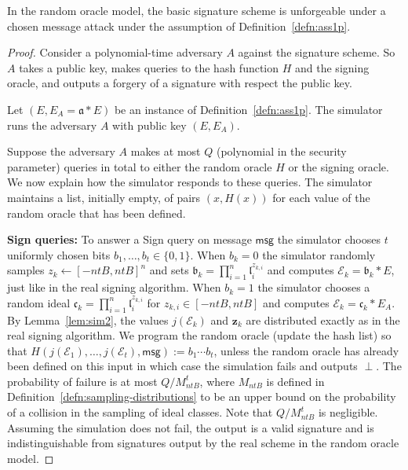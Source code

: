 \documentclass{llncs}
\newcommand{\E}{\mathcal{E}}
\newcommand{\msg}{\mathsf{msg}}
\renewcommand{\a}{\mathfrak{a}}
\renewcommand{\b}{\mathfrak{b}}
\renewcommand{\c}{\mathfrak{c}}
\renewcommand{\l}{\mathfrak{l}}
\newcommand{\z}{\mathbf{z}}
\begin{document}
\begin{theorem}\label{thm:security-basic}
In the random oracle model, the basic signature scheme is unforgeable under a chosen message attack under the assumption of Definition~\ref{defn:ass1p}.
\end{theorem}

\begin{proof}
Consider a polynomial-time adversary $A$ against the signature scheme. So $A$ takes a public key, makes queries to the hash function $H$ and the signing oracle, and outputs a forgery of a signature with respect the public key.

Let $(E, E_A = \a * E )$ be an instance of Definition~\ref{defn:ass1p}.
The simulator runs the adversary $A$ with public key $(E, E_A)$.

Suppose the adversary $A$ makes at most $Q$ (polynomial in the security parameter) queries in total to either the random oracle $H$ or the signing oracle. We now explain how the simulator responds to these queries. The simulator maintains a list, initially empty, of pairs $(x, H(x))$ for each value of the random oracle that has been defined.

\vskip 0.1cm

\noindent \textbf{Sign queries:}
To answer a Sign query on message $\msg$ the simulator chooses 
$t$ uniformly chosen bits $b_1, \dots, b_t \in \{0,1\}$.
When $b_k = 0$ the simulator randomly samples $z_k \leftarrow [-ntB,ntB]^n$ and sets $\b_k = \prod_{i=1}^n \l_i^{z_{k,i}}$ and computes $\E_k = \b_k * E$, just like in the real signing algorithm.
When $b_k = 1$ the simulator chooses a random ideal $\c_k = \prod_{i=1}^n \l_i^{z_{k,i}}$ for $z_{k,i} \in [-ntB, ntB]$
and computes $\E_k = \c_k * E_A$.
By Lemma~\ref{lem:sim2}, the values $j( \E_k )$ and $\z_k$ are distributed exactly as in the real signing algorithm.
We program the random oracle (update the hash list) so that $H( j( \E_1), \dots, j(\E_t), \msg ) := b_1 \cdots b_t$, unless the random oracle has already been defined on this input in which case the simulation fails and outputs $\perp$.
The probability of failure is at most $Q/M_{ntB}^t$, 
where $M_{ntB}$ is defined in Definition~\ref{defn:sampling-distributions} to be an upper bound on the probability of a collision in the sampling of ideal classes.
Note that $Q/M_{ntB}^t$ is negligible.
Assuming the simulation does not fail, the output is a valid signature and is indistinguishable from signatures output by the real scheme in the random oracle model.


\end{proof}
\end{document}

